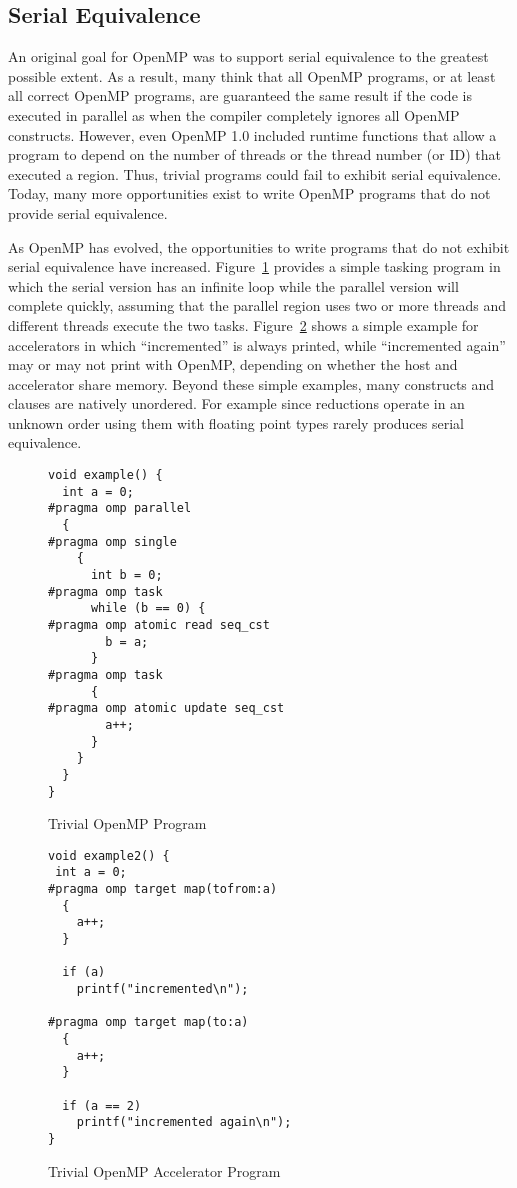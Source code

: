 \subsection{Serial Equivalence}
\label{sub:serial_equivalence}

An original goal for OpenMP was to support serial equivalence to the 
greatest possible extent. As a result, many think that all OpenMP programs, 
or at least all correct OpenMP programs, are guaranteed the same result
if the code is executed in parallel as when the compiler completely 
ignores all OpenMP constructs. However, even OpenMP 1.0 included runtime
functions that allow a program to depend on the number of threads or the
thread number (or ID) that executed a region. Thus, trivial programs could
fail to exhibit serial equivalence. Today, many more opportunities exist
to write OpenMP programs that do not provide serial equivalence. 

As OpenMP has evolved, the opportunities to write programs that do not exhibit
serial equivalence have increased. Figure~\ref{fig:trivial_task} provides a
simple tasking program in which the serial version has an infinite loop while
the parallel version will complete quickly, assuming that the parallel region
uses two or more threads and different threads execute the two tasks.
Figure~\ref{fig:trivial_target} shows a simple example for accelerators in
which ``incremented'' is always printed, while ``incremented again'' may or may
not print with OpenMP, depending on whether the host and accelerator share
memory. Beyond these simple examples, many constructs and clauses are natively
unordered. For example since reductions operate in an unknown order using them
with floating point types rarely produces serial equivalence.

\begin{figure}
\begin{verbatim}
void example() {
  int a = 0;
#pragma omp parallel
  {
#pragma omp single
    {
      int b = 0;
#pragma omp task
      while (b == 0) {
#pragma omp atomic read seq_cst
        b = a;
      }
#pragma omp task
      {
#pragma omp atomic update seq_cst
        a++;
      }
    }
  }
}
\end{verbatim}
\caption{Trivial OpenMP Program\label{fig:trivial_task}}
\end{figure}

\begin{figure}
\begin{verbatim}
void example2() {
 int a = 0;
#pragma omp target map(tofrom:a)
  {
    a++;
  }

  if (a)
    printf("incremented\n");
  
#pragma omp target map(to:a)
  {
    a++;
  }

  if (a == 2)
    printf("incremented again\n");
}
\end{verbatim}
\caption{Trivial OpenMP Accelerator Program\label{fig:trivial_target}}
\end{figure}



